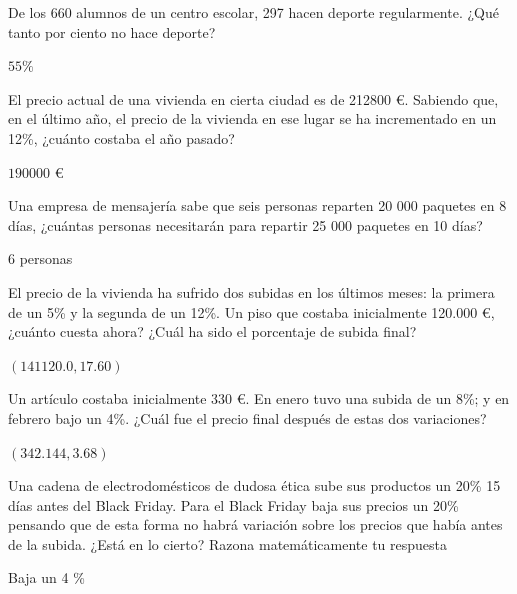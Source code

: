 \documentclass[addpoints,spanish, 12pt,a4paper]{exam}
\begin{document}
\begin{questions}
\question[2] De los 660 alumnos de un centro escolar, 297 hacen deporte regularmente. ¿Qué tanto por ciento no hace deporte?
\begin{solution}
$55\%$
\end{solution}

\question[2]El precio actual de una vivienda en cierta ciudad es de 212800 \euro. Sabiendo que, en el último año, el precio de la vivienda en ese lugar se ha incrementado en un 12\%, ¿cuánto costaba el año pasado?
\begin{solution}
$190000$ \euro
\end{solution}

\question[2] Una empresa de mensajería sabe que seis personas reparten 20 000 paquetes en 8 días, ¿cuántas personas necesitarán para repartir 25 000 paquetes en 10 días?
\begin{solution}
6 personas
\end{solution}

\question[2]  El precio de la vivienda ha sufrido dos subidas en los últimos meses: la primera de un 5\% y la segunda de un 12\%. Un piso que costaba inicialmente 120.000 \euro, ¿cuánto cuesta ahora? ¿Cuál ha sido el porcentaje de subida final?
\begin{solution}
$(141120.0, 17.60)$
\end{solution}

\question[2] Un artículo costaba inicialmente 330 \euro. En enero tuvo una subida de un 8\%; y en febrero bajo un 4\%. ¿Cuál fue el precio final después de estas dos variaciones?
\begin{solution}
$(342.144, 3.68)$
\end{solution}

\question[2] Una cadena de electrodomésticos de dudosa ética sube sus productos un 20\% 15 días antes del Black Friday. Para el Black Friday baja sus precios un 20\% pensando que de esta forma no habrá variación sobre los precios que había antes de la subida. ¿Está en lo cierto? Razona matemáticamente tu respuesta
\begin{solution}
Baja un 4 \%
\end{solution}



\addpoints

\end{questions}
\end{document}
